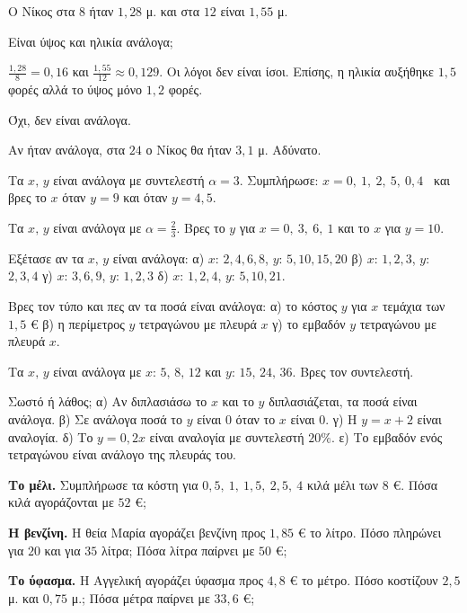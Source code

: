 \tixero Ο Νίκος στα $8$ ήταν $1{,}28$ μ. και στα $12$ είναι $1{,}55$ μ.\par
\tithelo Είναι ύψος και ηλικία ανάλογα;\par
\possindeo $\frac{1{,}28}{8}=0{,}16$ και $\frac{1{,}55}{12}\approx0{,}129$. Οι λόγοι δεν είναι ίσοι. Επίσης, η ηλικία αυξήθηκε $1{,}5$ φορές αλλά το ύψος μόνο $1{,}2$ φορές.\par
\apantisi Όχι, δεν είναι ανάλογα.\par
\elegxos Αν ήταν ανάλογα, στα $24$ ο Νίκος θα ήταν $3{,}1$ μ. Αδύνατο.



\ex Τα $x,\,y$ είναι ανάλογα με συντελεστή $\alpha=3$. Συμπλήρωσε: $x=0,\ 1,\ 2,\ 5,\ 0{,}4$ \ και βρες το $x$ όταν $y=9$ και όταν $y=4{,}5$.

\ex Τα $x,\,y$ είναι ανάλογα με $\alpha=\frac{2}{3}$. Βρες το $y$ για $x=0,\ 3,\ 6,\ 1$ και το $x$ για $y=10$.

\ex Εξέτασε αν τα $x,\,y$ είναι ανάλογα: α) $x$: $2,4,6,8$, $y$: $5,10,15,20$ \quad β) $x$: $1,2,3$, $y$: $2,3,4$ \quad γ) $x$: $3,6,9$, $y$: $1,2,3$ \quad δ) $x$: $1,2,4$, $y$: $5,10,21$.

\ex Βρες τον τύπο και πες αν τα ποσά είναι ανάλογα: α) το κόστος $y$ για $x$ τεμάχια των $1{,}5$ € \quad β) η περίμετρος $y$ τετραγώνου με πλευρά $x$ \quad γ) το εμβαδόν $y$ τετραγώνου με πλευρά $x$.

\ex Τα $x,\,y$ είναι ανάλογα με $x$: $5,\,8,\,12$ και $y$: $15,\,24,\,36$. Βρες τον συντελεστή.

\ex Σωστό ή λάθος; α) Αν διπλασιάσω το $x$ και το $y$ διπλασιάζεται, τα ποσά είναι ανάλογα. \quad β) Σε ανάλογα ποσά το $y$ είναι $0$ όταν το $x$ είναι $0$. \quad γ) Η $y=x+2$ είναι αναλογία. \quad δ) Το $y=0{,}2x$ είναι αναλογία με συντελεστή $20\%$. \quad ε) Το εμβαδόν ενός τετραγώνου είναι ανάλογο της πλευράς του.


\ex \textbf{Το μέλι.} Συμπλήρωσε τα κόστη για $0{,}5,\ 1,\ 1{,}5,\ 2{,}5,\ 4$ κιλά μέλι των $8$ €. Πόσα κιλά αγοράζονται με $52$ €;

\ex \textbf{Η βενζίνη.} Η θεία Μαρία αγοράζει βενζίνη προς $1{,}85$ € το λίτρο. Πόσο πληρώνει για $20$ και για $35$ λίτρα; Πόσα λίτρα παίρνει με $50$ €;

\ex \textbf{Το ύφασμα.} Η Αγγελική αγοράζει ύφασμα προς $4{,}8$ € το μέτρο. Πόσο κοστίζουν $2{,}5$ μ. και $0{,}75$ μ.; Πόσα μέτρα παίρνει με $33{,}6$ €;

